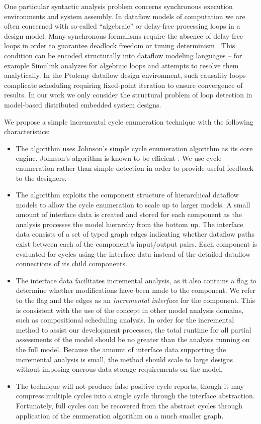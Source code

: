 One particular syntactic analysis problem concerns synchronous execution environments 
and system assembly.  In dataflow models of computation we are often concerned with 
so-called ``algebraic'' or delay-free processing loops in a design model.  Many
synchronous formalisms require the absence of delay-free loops in order to 
guarantee deadlock freedom \cite{moc:ltta} or timing determinism \cite{moc:sdf}.
This condition can be encoded structurally into dataflow modeling languages --
for example Simulink \cite{tools:mathworks} analyzes for algebraic loops and attempts to resolve them analytically.  In the Ptolemy dataflow design environment, such causality loops 
complicate scheduling requiring fixed-point iteration to ensure convergence of 
results\cite{tools:ptolemy2}. In our work we only consider the structural 
problem of loop detection in model-based distributed embedded system designs.

We propose a simple incremental cycle enumeration technique with the following
characteristics:

\begin{itemize}
\item The algorithm uses Johnson's simple cycle enumeration algorithm as its 
core engine\cite{cycles:johnson75}.  Johnson's algorithm is known to be 
efficient \cite{cycles:mateti76}.  We use cycle enumeration rather than simple
detection in order to provide useful feedback to the designers.
\item The algorithm exploits the component structure of hierarchical dataflow 
models to allow the cycle enumeration to scale up to larger models.   A small amount of interface data is created and stored for each component as the analysis processes the model hierarchy from the bottom up.  The interface data consists of a set of typed graph edges indicating whether dataflow paths exist between each of the component's input/output pairs.  Each component is evaluated for cycles using the interface data instead of the detailed dataflow connections of its child components.
\item   The interface data facilitates incremental analysis, as it also contains a flag to determine whether modifications have been made to the component.  We refer to the flag and the edges as an \emph{incremental interface} for the component.  This is consistent with the use of the concept in other model analysis domains, such as compositional scheduling analysis\cite{sched:easwaran}. In order for the incremental method to assist our development processes, the total runtime for all partial assessments of the model should be no greater than the analysis running on the full model.  Because the amount of interface data supporting the incremental analysis is small, the method should scale to large designs without imposing onerous data storage requirements on the model.
\item The technique will not produce false positive cycle reports, though it 
may compress multiple cycles into a single cycle through the interface abstraction.  Fortunately,
full cycles can be recovered from the abstract cycles through application
of the enumeration algorithm on a much smaller graph.
\end{itemize}

